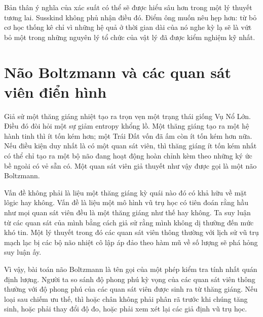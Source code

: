 \begin{classroomqa}
\end{classroomqa}

Bản thân ý nghĩa của xác suất có thể sẽ được hiểu sâu hơn trong một lý thuyết tương lai. Susskind không phủ nhận điều đó. Điểm ông muốn nêu hẹp hơn: từ bỏ cơ học thống kê chỉ vì những hệ quả ở thời gian dài của nó nghe kỳ lạ sẽ là vứt bỏ một trong những nguyên lý tổ chức của vật lý đã được kiểm nghiệm kỹ nhất.

\section{Não Boltzmann và các quan sát viên điển hình}

Giả sử một thăng giáng nhiệt tạo ra trọn vẹn một trạng thái giống Vụ Nổ Lớn. Điều đó đòi hỏi một sự giảm entropy khổng lồ. Một thăng giáng tạo ra một hệ hành tinh thì ít tốn kém hơn; một Trái Đất vốn đã ấm còn ít tốn kém hơn nữa. Nếu điều kiện duy nhất là có một quan sát viên, thì thăng giáng ít tốn kém nhất có thể chỉ tạo ra một bộ não đang hoạt động hoàn chỉnh kèm theo những ký ức bề ngoài có vẻ sẵn có. Một quan sát viên giả thuyết như vậy được gọi là một não Boltzmann.

Vấn đề không phải là liệu một thăng giáng kỳ quái nào đó có khả hữu về mặt lôgic hay không. Vấn đề là liệu một mô hình vũ trụ học có tiên đoán rằng hầu như mọi quan sát viên đều là một thăng giáng như thế hay không. Ta suy luận từ các quan sát của mình bằng cách giả sử rằng mình không dị thường đến mức khó tin. Một lý thuyết trong đó các quan sát viên thông thường với lịch sử vũ trụ mạch lạc bị các bộ não nhiệt cô lập áp đảo theo hàm mũ về số lượng sẽ phá hỏng suy luận ấy.

Vì vậy, bài toán não Boltzmann là tên gọi của một phép kiểm tra tính nhất quán định lượng. Người ta so sánh độ phong phú kỳ vọng của các quan sát viên thông thường với độ phong phú của các quan sát viên được sinh ra từ thăng giáng. Nếu loại sau chiếm ưu thế, thì hoặc chân không phải phân rã trước khi chúng tăng sinh, hoặc phải thay đổi độ đo, hoặc phải xem xét lại các giả định vũ trụ học.

